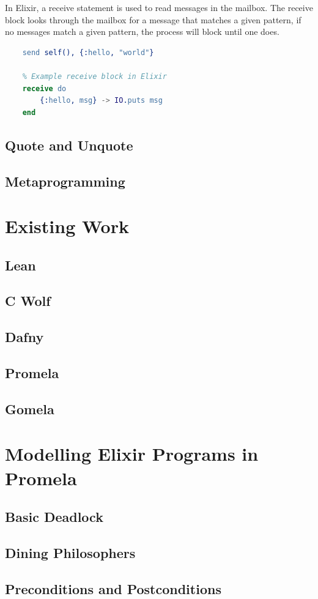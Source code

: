 \par
In Elixir, a receive statement is used to read messages in the mailbox. The receive block looks through the mailbox for a message that matches a given pattern, if no messages match a given pattern, the process will block until one does.
\begin{lstlisting}[language=Erlang, xleftmargin=.2\linewidth, caption={An example of spawn/1 and spawn/4 in Elixir for spawning a new lightweight process and a new Elixir node}]
    % Example send in Elixir
    send self(), {:hello, "world"}

    % Example receive block in Elixir
    receive do
        {:hello, msg} -> IO.puts msg
    end
\end{lstlisting}
\subsection[]{Quote and Unquote}
\subsection[]{Metaprogramming}
\section[]{Existing Work}
\subsection[]{Lean}
\subsection[]{C Wolf}
\subsection[]{Dafny}
\subsection[]{Promela}
\subsection[]{Gomela}
\section[]{Modelling Elixir Programs in Promela}
\subsection[]{Basic Deadlock}
\subsection[]{Dining Philosophers}
\subsection[]{Preconditions and Postconditions}

